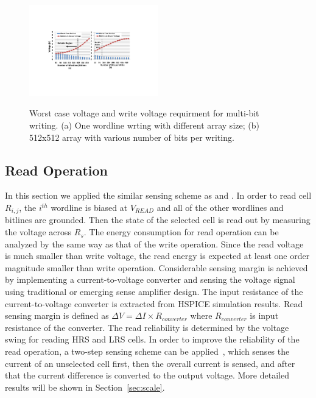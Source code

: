 \begin{figure}%
\centering\label{fig:multi_V}
  \includegraphics[width=0.5\textwidth]{./figures/multi_V.pdf}\\
  \caption{Worst case voltage and write voltage requirment for multi-bit writing. (a) One wordline wrting with different array size; (b) 512x512 array with various number of bits per writing.}\label{fig:reliable_region}
    \vspace{-10pt}
\end{figure}
\subsection{Read Operation}
In this section we applied the similar sensing scheme as
\cite{crossbar_TED_2010} and \cite{crossbar_NANO08_Flocke}. In order to
read cell $R_{i,j}$, the $i^{th}$ wordline is biased at $V_{READ}$ and all
of the other wordlines and bitlines are grounded. Then the state of the
selected cell is read out by measuring the voltage across $R_s$. The
energy consumption for read operation can be analyzed by the same way as
that of the write operation. Since the read voltage is much smaller than
write voltage, the read energy is expected at least one order magnitude smaller than
write operation. Considerable sensing margin is achieved by implementing a
current-to-voltage converter and sensing the voltage signal using
traditional or emerging sense amplifier design. The input resistance of
the current-to-voltage converter is extracted from HSPICE simulation
results. Read sensing margin is defined as $\Delta V = \Delta I \times
R_{converter}$ where $R_{converter}$ is input resistance of the converter. The read reliability
is determined by the voltage swing for reading HRS and LRS cells. In order to improve the reliability of the read
operation, a two-step sensing scheme can be applied~\cite{memristor:Cong}, which senses the current of an unselected cell first, then the overall current is sensed, and after that the current difference is converted to the output voltage. More detailed results will be shown in Section~\ref{sec:scale}.

